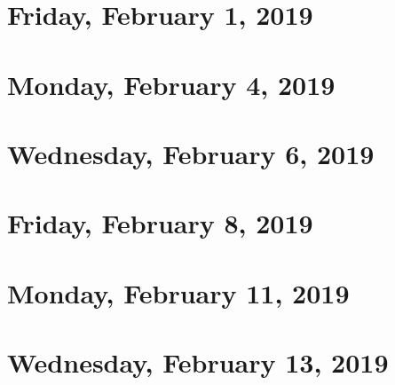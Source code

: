 \documentclass[reqno]{amsart}
\begin{document}
\section{Friday, February 1, 2019}
    

\section{Monday, February 4, 2019}
    
    
\section{Wednesday, February 6, 2019}
    

\section{Friday, February 8, 2019}
    
    
\section{Monday, February 11, 2019}
    
    
\section{Wednesday, February 13, 2019}
    
\end{document}
